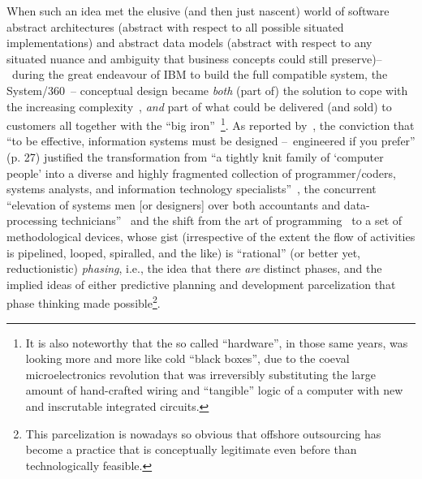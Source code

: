 \documentclass{article}
\begin{document}
When such an idea met the elusive (and then just nascent) world of software abstract architectures (abstract with respect to all possible situated implementations) and abstract data models (abstract with respect to any situated nuance and ambiguity that business concepts could still preserve)--~during the great endeavour of IBM to build the full compatible system, the System/360~-- conceptual design became \emph{both} (part of) the solution to cope with the increasing complexity~\citep{noble_america_1979}, \emph{and} part of what could be delivered (and sold) to customers all together with the ``big iron''~\citep{haigh_software_2002}\footnote{It is also noteworthy that the so called ``hardware'', in those same years, was looking more and more like cold ``black boxes'', due to the coeval microelectronics revolution that was irreversibly substituting the large amount of hand-crafted wiring and ``tangible'' logic of a computer with new and inscrutable integrated circuits.}. As reported by~\citet{haigh_inventing_2011}, the conviction that ``to be effective, information systems must be designed --~engineered if you prefer'' (p. 27) justified the transformation from ``a tightly knit family of `computer people' into a diverse and highly fragmented collection of programmer/coders, systems analysts, and information technology specialists''~\citep{ensmenger_black_2001}, the concurrent ``elevation of systems men [or designers] over both accountants and data-processing technicians''~\citep{haigh_inventing_2011} and the shift from the art of programming~\citep{ensmenger_black_2001} to a set of methodological devices, whose gist (irrespective of the extent the flow of activities is pipelined, looped, spiralled, and the like) is ``rational'' (or better yet, reductionistic) \emph{phasing}, i.e., the idea that there \emph{are} distinct phases, and the implied ideas of either predictive planning and development parcelization that phase thinking
made possible\footnote{This parcelization is nowadays so obvious that offshore outsourcing has become a practice that is conceptually legitimate even before than technologically feasible.}. 
\end{document}
